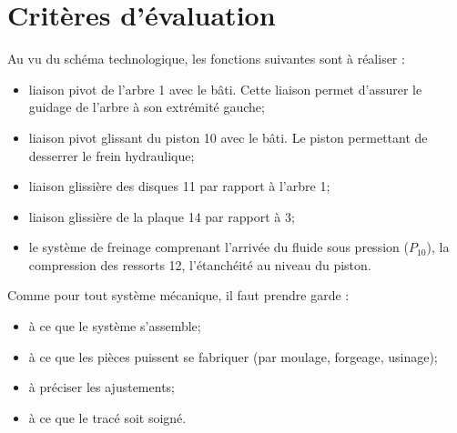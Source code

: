 \documentclass[11pt,oneside]{article}
\begin{document}
\begin{center}
\end{center}



\section*{Critères d'évaluation}

Au vu du schéma technologique, les fonctions suivantes sont à réaliser :
\begin{itemize}
\item liaison pivot de l'arbre 1 avec le bâti. Cette liaison permet d'assurer le guidage de l'arbre à son extrémité gauche;
\item liaison pivot glissant du piston 10 avec le bâti. Le piston permettant de desserrer le frein hydraulique;
\item liaison glissière des disques 11 par rapport à l'arbre 1;
\item liaison glissière de la plaque 14 par rapport à 3;
\item le système de freinage comprenant l'arrivée du fluide sous pression ($P_{10}$), la compression des ressorts 12, l'étanchéité au niveau du piston.
\end{itemize}

Comme pour tout système mécanique, il faut prendre garde : 
\begin{itemize}
\item à ce que le système s'assemble;
\item à ce que les pièces puissent se fabriquer (par moulage, forgeage, usinage);
\item à préciser les ajustements;
\item à ce que le tracé soit soigné.
\end{itemize}
\end{document}
